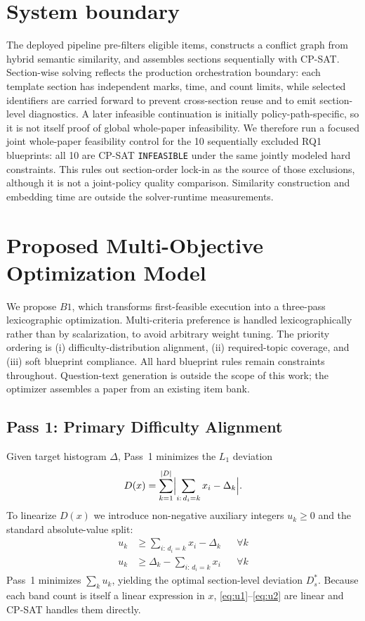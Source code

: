\documentclass[runningheads]{llncs}
\begin{document}
\section{System boundary}
\label{sec:system}
The deployed pipeline pre-filters eligible items, constructs a conflict graph from hybrid semantic similarity, and assembles sections sequentially with CP-SAT. Section-wise solving reflects the production orchestration boundary: each template section has independent marks, time, and count limits, while selected identifiers are carried forward to prevent cross-section reuse and to emit section-level diagnostics. A later infeasible continuation is initially policy-path-specific, so it is not itself proof of global whole-paper infeasibility. We therefore run a focused joint whole-paper feasibility control for the 10 sequentially excluded RQ1 blueprints: all 10 are CP-SAT \texttt{INFEASIBLE} under the same jointly modeled hard constraints. This rules out section-order lock-in as the source of those exclusions, although it is not a joint-policy quality comparison. Similarity construction and embedding time are outside the solver-runtime measurements.

\section{Proposed Multi-Objective Optimization Model}
\label{sec:proposed}

We propose $B1$, which transforms first-feasible execution into a three-pass lexicographic optimization.
Multi-criteria preference is handled lexicographically~\cite{ehrgott2005} rather than by scalarization, to avoid arbitrary weight tuning.
The priority ordering is (i) difficulty-distribution alignment, (ii) required-topic coverage, and (iii) soft blueprint compliance.
All hard blueprint rules remain constraints throughout. Question-text generation is outside the scope of this work;
the optimizer assembles a paper from an existing item bank.

\subsection{Pass 1: Primary Difficulty Alignment}
Given target histogram $\Delta$, Pass~1 minimizes the $L_1$ deviation
\begin{equation}
D(x)=\sum_{k=1}^{|D|}\Bigl|\sum_{i:\,d_i=k} x_i - \Delta_k\Bigr|.
\end{equation}
To linearize $D(x)$ we introduce non-negative auxiliary integers $u_k\ge 0$ and the standard absolute-value split:
\begin{align}
u_k &\ge \textstyle\sum_{i:\,d_i=k} x_i - \Delta_k &&\forall k \label{eq:u1}\\
u_k &\ge \Delta_k - \textstyle\sum_{i:\,d_i=k} x_i &&\forall k \label{eq:u2}
\end{align}
Pass~1 minimizes $\sum_k u_k$, yielding the optimal section-level deviation $D_s^\ast$.
Because each band count is itself a linear expression in $x$, \eqref{eq:u1}--\eqref{eq:u2} are linear and CP-SAT handles them directly.
\end{document}
